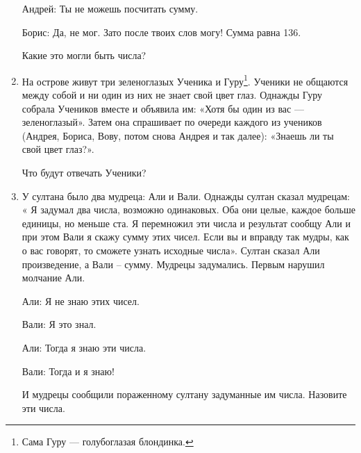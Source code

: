\documentclass[12pt]{article}
\theoremstyle{definition}
\begin{document}
\begin{enumerate}
Андрей: Ты не можешь посчитать сумму.

Борис: Да, не мог. Зато после твоих слов могу! Сумма равна 136. 

Какие это могли быть числа?

\begin{comment}
\item Два детектива расследуют Загадочное убийство. 

Возможны девять вариантов:

\begin{tabular}{cccccccccc}
\toprule
Вариант & А & Б & В & Г & Д & Е & Ё & Ж & З \\
\midrule
Место & Москва & Москва & Москва & Москва & Москва & Москва & Москва & Москва & Москва & \\
Погода & Москва & Москва & Москва & Москва & Москва & Москва & Москва & Москва & Москва & \\
Орудие & Москва & Москва & Москва & Москва & Москва & Москва & Москва & Москва & Москва & \\
\bottomrule
\end{tabular}

Черновик задачки по мотивам Common knowledge, Geanakoplos. Статья из handbook of game theory.

\end{comment}

\item На острове живут три зеленоглазых Ученика и Гуру\footnote{Сама Гуру — голубоглазая блондинка.}.
Ученики не общаются между собой и ни один из них не знает свой цвет глаз.
Однажды Гуру собрала Учеников вместе и объявила им: «Хотя бы один из вас — зеленоглазый».
Затем она спрашивает по очереди каждого из учеников (Андрея, Бориса, Вову, потом снова Андрея и так далее): 
«Знаешь ли ты свой цвет глаз?».

Что будут отвечать Ученики?


\item У султана было два мудреца: Али и Вали. Однажды султан сказал мудрецам: «
Я задумал два числа, возможно одинаковых. 
Оба они целые, каждое больше единицы, но меньше ста. 
Я перемножил эти числа и результат сообщу Али и при этом Вали я скажу сумму этих чисел. 
Если вы и вправду так мудры, как о вас говорят, то сможете узнать исходные числа».
Султан сказал Али произведение, а Вали – сумму. Мудрецы задумались. Первым нарушил молчание Али.

Али: Я не знаю этих чисел.

Вали: Я это знал.

Али: Тогда я знаю эти числа.

Вали: Тогда и я знаю! 

И мудрецы сообщили пораженному султану задуманные им числа. Назовите эти числа.

\end{enumerate}
\end{document}

